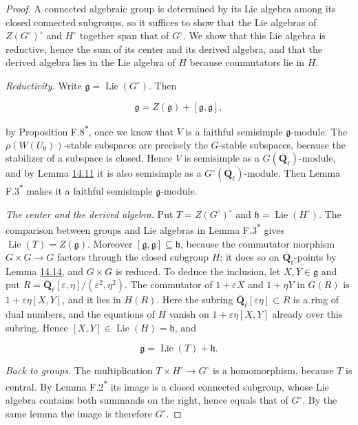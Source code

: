 \documentclass[11pt]{article}
\newcommand{\bpout}[1]{#1\textsuperscript{\hyperlink{bp-outside}{\ensuremath{\ast}}}}
\begin{document}
\begin{proof}[{Proof}]\label{bp88}%
A connected algebraic group is determined by its Lie algebra among its closed connected subgroups, so it suffices to show that the Lie algebras of \(Z(G^\circ)^\circ\) and \(H^\circ\) together span that of \(G^\circ\). We show that this Lie algebra is reductive, hence the sum of its center and its derived algebra, and that the derived algebra lies in the Lie algebra of \(H\) because commutators lie in \(H\).

\emph{Reductivity.} Write \(\mathfrak g=\operatorname{Lie}(G^\circ)\). Then

\[
\mathfrak g=Z(\mathfrak g)+[\mathfrak g,\mathfrak g],
\]

by Proposition \bpout{F.8}, once we know that \(V\) is a faithful semisimple \(\mathfrak g\)-module. The \(\rho(W(U_0))\)-stable subspaces are precisely the \(G\)-stable subspaces, because the stabilizer of a subspace is closed. Hence \(V\) is semisimple as a \(G(\overline{\mathbf Q}_\ell)\)-module, and by Lemma \hyperref[bp75]{14.11} it is also semisimple as a \(G^\circ(\overline{\mathbf Q}_\ell)\)-module. Then Lemma \bpout{F.3} makes it a faithful semisimple \(\mathfrak g\)-module.

\emph{The center and the derived algebra.} Put \(T=Z(G^\circ)^\circ\) and \(\mathfrak h=\operatorname{Lie}(H^\circ)\). The comparison between groups and Lie algebras in Lemma \bpout{F.3} gives \(\operatorname{Lie}(T)=Z(\mathfrak g)\). Moreover \([\mathfrak g,\mathfrak g]\subseteq\mathfrak h\), because the commutator morphism \(G\times G\to G\) factors through the closed subgroup \(H\): it does so on \(\overline{\mathbf Q}_\ell\)-points by Lemma \hyperref[bp84]{14.14}, and \(G\times G\) is reduced. To deduce the inclusion, let \(X,Y\in\mathfrak g\) and put \(R=\overline{\mathbf Q}_\ell[\varepsilon,\eta]/(\varepsilon^2,\eta^2)\). The commutator of \(1+\varepsilon X\) and \(1+\eta Y\) in \(G(R)\) is \(1+\varepsilon\eta[X,Y]\), and it lies in \(H(R)\). Here the subring \(\overline{\mathbf Q}_\ell[\varepsilon\eta]\subset R\) is a ring of dual numbers, and the equations of \(H\) vanish on \(1+\varepsilon\eta[X,Y]\) already over this subring. Hence \([X,Y]\in\operatorname{Lie}(H)=\mathfrak h\), and

\[
\mathfrak g=\operatorname{Lie}(T)+\mathfrak h.
\]

\emph{Back to groups.} The multiplication \(T\times H^\circ\to G^\circ\) is a homomorphism, because \(T\) is central. By Lemma \bpout{F.2} its image is a closed connected subgroup, whose Lie algebra contains both summands on the right, hence equals that of \(G^\circ\). By the same lemma the image is therefore \(G^\circ\).
\end{proof}
\end{document}
